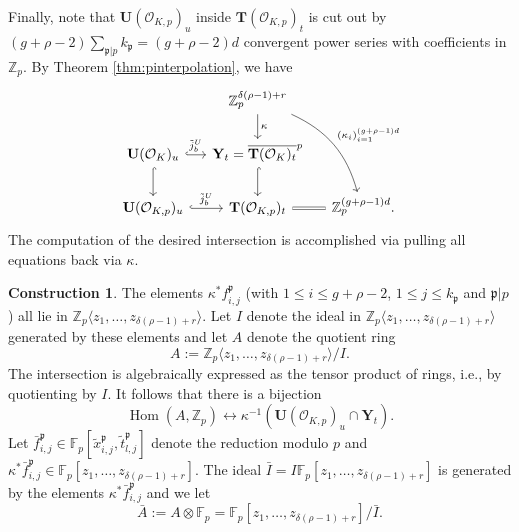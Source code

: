 \documentclass[11pt,oneside]{amsart}
\theoremstyle{plain}
\theoremstyle{definition}
\newtheorem{construction}[theorem]{Construction}
\DeclareMathOperator{\Hom}{Hom}
\def\fp{\mathfrak{p}}
\def\TT{\mathbf{T}}
\def\Z{\mathbb{Z}}
\def\F{\mathbb{F}}
\def\U{\mathbf{U}}
\def\Y{\mathbf{Y}}
\def\oh{\mathcal{O}}
\begin{document}
Finally, note that $\U(\oh_{K, p})_u$ inside $\TT(\oh_{K, p})_t$ is cut out by $(g+\rho-2)\sum_{\fp\vert p} k_{\fp}=(g+\rho-2)d$ convergent power series with coefficients in $\Z_p$. By Theorem \ref{thm:pinterpolation}, we have  
\begin{equation*}
\begin{tikzcd}[column sep=small, bend angle = 25]
    & \Z_p^{\delta(\rho-1)+r} \arrow[bend left]{ddr}{(\kappa_i)_{i=1}^{(g+\rho-1)d}} \arrow{d}{\kappa}
    & \\
    \U(\oh_K)_u \arrow[hook]{r}{\tilde{j}_b^U}  \arrow[hook]{d}
    & \Y_t = \overline{\TT(\oh_K)_t}^p \arrow[hook]{d}
    & \\
    \U(\oh_{K,p})_u \arrow[hook]{r}{\tilde{j}_b^U} 
    & \TT(\oh_{K,p})_t \arrow[equal]{r} 
    & \Z_p^{(g+\rho-1)d}.
\end{tikzcd}
\end{equation*}
The computation of the desired intersection is accomplished via pulling all equations back via $\kappa$.

\begin{construction}
The elements $\kappa^* f_{i, j}^{\fp}$ (with $1\leq i\leq g+\rho-2$, $1\leq j\leq k_{\fp}$ and $\fp\vert p$) all lie in $\Z_p\langle z_1, \ldots, z_{\delta(\rho-1)+r} \rangle$. Let $I$ denote the ideal in $\Z_p\langle z_1, \ldots, z_{\delta(\rho-1)+r} \rangle$ generated by these elements and let $A$ denote the quotient ring 
$$
A:=\Z_p\langle z_1, \ldots, z_{\delta(\rho-1)+r} \rangle/I.
$$
The intersection is algebraically expressed as the tensor product of rings, i.e., by quotienting by $I$. It follows that there is a bijection 
\begin{equation}\label{HomA}
    \Hom(A, \Z_p) \longleftrightarrow \kappa^{-1}(\U(\oh_{K, p})_u\cap \Y_t).
\end{equation}
Let $\bar{f}_{i, j}^{\fp}\in \F_p[\tilde{x}_{i, j}^{\fp}, \tilde{t}_{l, j}^{\fp}]$ denote the reduction modulo $p$ and $\kappa^* \bar{f}_{i, j}^{\fp}\in \F_p[z_1, \ldots, z_{\delta(\rho-1)+r}]$. The ideal $\bar{I}=I \F_p[z_1, \ldots, z_{\delta(\rho-1)+r}]$ is generated by the elements $\kappa^* \bar{f}_{i, j}^{\fp}$ and we let 
\[
\bar{A}:=A\otimes \F_p=\F_p[z_1, \ldots, z_{\delta(\rho-1)+r}]/\bar{I}.
\]
\end{construction}
\end{document}
